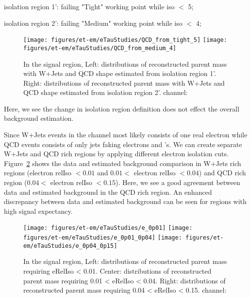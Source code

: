 \tauh isolation region 1': \tauh failing "Tight" working point while \tauh iso $<$ 5;

\tauh isolation region 2': \tauh failing "Medium" working point while \tauh iso $<$ 4;

\begin{figure}\centering
  \texttt{[image: figures/et-em/eTauStudies/QCD\_from\_tight\_5]}
  \texttt{[image: figures/et-em/eTauStudies/QCD\_from\_medium\_4]}
  \caption{\label{fig:QCD_check_1} In the signal region, Left: distributions of 
    reconstructed parent mass with W+Jets and QCD shape estimated from 
    \tauh isolation region 1'. Right: distributions of 
    reconstructed parent mass with W+Jets and QCD shape estimated from 
    \tauh isolation region 2'. 
    \teth channel: \meffetau}
\end{figure}

Here, we see the change in \tauh isolation region definition does not effect 
the overall background estimation.


Since W+Jets events in the \teth channel most likely consists of one real electron
while QCD events consists of only jets faking electrons and \tauh's. We can create
separate W+Jets and QCD rich regions by applying different electron isolation cuts.
Figure~\ref{fig:eRelIso} shows the data and estimated background comparison in
W+Jets rich regions (electron relIso $< 0.01$ and $0.01<$ electron relIso $< 0.04$)
and QCD rich region ($0.04<$ electron relIso $< 0.15$). Here, we see a good
agreement between data and estimated background in the QCD rich region. An enhanced
discrepancy between data and estimated background can be seen for regions with
high signal expectancy.  

\begin{figure}\centering
  \texttt{[image: figures/et-em/eTauStudies/e\_0p01]}
  \texttt{[image: figures/et-em/eTauStudies/e\_0p01\_0p04]}
  \texttt{[image: figures/et-em/eTauStudies/e\_0p04\_0p15]}
  \caption{\label{fig:eRelIso} In the signal region, Left: distributions of 
    reconstructed parent mass requiring eRelIso < 0.01. Center: distributions of 
    reconstructed parent mass requiring 0.01 < eRelIso < 0.04. Right: 
    distributions of reconstructed parent mass requiring 0.04 < eRelIso < 0.15. 
    \teth channel: \meffetau}
\end{figure}


